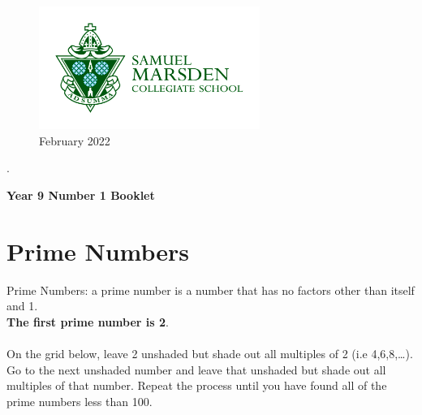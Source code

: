 \documentclass[a4paper,12pt]{article}
\begin{document}
\thispagestyle{empty}	
	\Large
	\begin{figure} 
		\centering
		\includegraphics[height=4cm]{Marsden_green_on_white.jpg}
		\caption*{February 2022}
	\end{figure}
	.
\vspace{3cm}
	\begin{center}
			\textbf{Year 9 Number 1 Booklet}
	\end{center}

	\vspace{3cm}
	
	\normalsize
	\newpage
	\tableofcontents
	\newpage
	
	\section{Prime Numbers}
	Prime Numbers: a prime number is a number that has no factors other than itself and 1.\\
	\textbf{The first prime number is 2}.\\\\
	On the grid below, leave 2 unshaded but shade out all multiples of 2 (i.e 4,6,8,…).\\ 
	Go to the next unshaded number and leave that unshaded but shade out all multiples of that number.
	Repeat the process until you have found all of the prime numbers less than 100.
	
	\begin{center}
\end{center}
\end{document}
